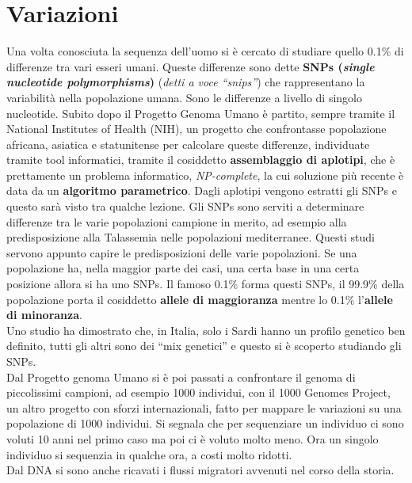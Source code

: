 \documentclass[a4paper,12pt, oneside]{book}
\begin{document}
\section{Variazioni}
Una volta conosciuta la sequenza dell'uomo si è cercato di studiare quello
0.1\% di differenze tra vari esseri umani. Queste differenze sono dette
\textbf{SNPs (\textit{single nucleotide polymorphisms})} (\textit{detti a voce
  ``snips''}) che rappresentano la variabilità nella popolazione umana. Sono le
differenze a livello di singolo nucleotide. Subito
dopo il Progetto Genoma Umano è partito, sempre tramite il National Institutes
of Health (NIH), un progetto che confrontasse popolazione africana, asiatica e
statunitense per calcolare queste differenze, individuate tramite tool
informatici, tramite il cosiddetto \textbf{assemblaggio di aplotipi}, che è
prettamente un problema informatico, \textit{NP-complete}, la cui soluzione più
recente è data da un \textbf{algoritmo parametrico}. Dagli aplotipi vengono
estratti gli SNPs e questo sarà visto tra qualche lezione. Gli SNPs sono serviti
a determinare differenze tra le varie popolazioni campione in merito, ad esempio
alla predisposizione alla Talassemia nelle popolazioni mediterranee. Questi
studi servono appunto capire le predisposizioni delle varie popolazioni. Se una
popolazione ha, nella maggior parte dei casi, una certa base in una certa
posizione allora si ha uno SNPs. Il famoso 0.1\% forma questi SNPs, il 99.9\%
della popolazione porta il cosiddetto \textbf{allele di maggioranza} mentre lo
0.1\% l'\textbf{allele di minoranza}.\\
Uno studio ha dimostrato che, in Italia, solo i Sardi hanno un profilo genetico
ben definito, tutti gli altri sono dei ``mix genetici'' e questo si è scoperto
studiando gli SNPs.\\
Dal Progetto genoma Umano si è poi passati a confrontare il genoma di
piccolissimi campioni, ad esempio 1000 individui, con il 1000 Genomes Project,
un altro progetto con sforzi internazionali, fatto per mappare le variazioni su
una popolazione di 1000 individui. Si segnala che per sequenziare un individuo
ci sono voluti 10 anni nel primo caso ma poi ci è voluto molto meno. Ora un
singolo individuo si sequenzia in qualche ora, a costi molto ridotti.\\
Dal DNA si sono anche ricavati i flussi migratori avvenuti nel corso della
storia.
\end{document}
